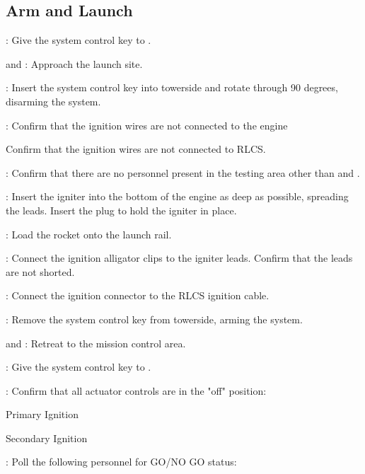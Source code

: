 \subsection{Arm and Launch}
\begin{checklist}
  \item \ops{}: Give the system control key to \primary{}.
  \item \primary{} and \secondary{}: Approach the launch site.
  \item \primary{}: Insert the system control key into towerside and rotate through 90 degrees, disarming the system.
  \item \secondary{}: Confirm that the ignition wires are not connected to the engine
  \item \secondary{} Confirm that the ignition wires are not connected to RLCS.
  \item \secondary{}: Confirm that there are no personnel present in the testing area other than \primary{} and \secondary{}.
  \item \primary{}: Insert the igniter into the bottom of the engine as deep as possible, spreading the leads. Insert the plug to hold the igniter in place.
  \item \primary{}: Load the rocket onto the launch rail.
  \item \primary{}: Connect the ignition alligator clips to the igniter leads. Confirm that the leads are not shorted.
  \item \primary{}: Connect the ignition connector to the RLCS ignition cable.
  \item \primary{}: Remove the system control key from towerside, arming the system.
  \item \primary{} and \secondary{}: Retreat to the mission control area. 
  \item \primary{}: Give the system control key to \ops{}.
  \item \control{}: Confirm that all actuator controls are in the "off" position:
  \begin{checklist}
    \item Primary Ignition
    \item Secondary Ignition
  \end{checklist}
  \item \ops{}: Poll the following personnel for GO/NO GO status:
  \begin{checklist}
    \item \secondary{}
    \item \primary{}

\end{checklist}
\end{checklist}
